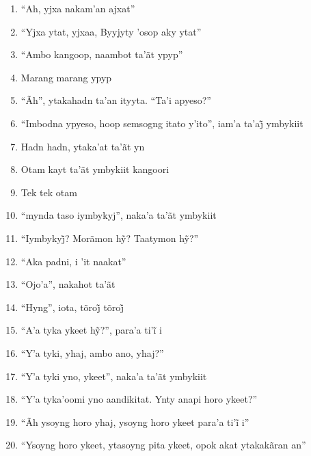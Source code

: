 \begin{enumerate}
 \item ``Ah, yjxa nakam'an ajxat''

 \item ``Yjxa ytat, yjxaa, Byyjyty 'osop aky ytat''

 \item ``Ambo kangoop, naambot ta'ãt ypyp''

 \item Marang marang ypyp

 \item ``Ãh'', ytakahadn ta'an ityyta. ``Ta'i apyeso?''

 \item ``Imbodna ypyeso, hoop semsogng itato y’ito'', iam’a ta’aj̃ ymbykiit

 \begin{center}\end{center}

 \item Hadn hadn, ytaka'at ta'ãt yn

 \item Otam kayt ta'ãt ymbykiit kangoori

 \item Tek tek otam

 \item ``mynda taso iymbykyj'', naka'a ta'ãt ymbykiit

 \item ``Iymbykyj̃? Morãmon hỹ? Taatymon hỹ?''

 \item ``Aka padni, i 'it naakat''

 \item ``Ojo'a'', nakahot ta'ãt

 \item ``Hyng'', iota, tõroj̃ tõroj̃

 \item ``A’a tyka ykeet hỹ?'', para’a ti’ĩ i

 \item ``Y'a tyki, yhaj, ambo ano, yhaj?''

 \item ``Y'a tyki yno, ykeet'', naka'a ta'ãt ymbykiit

 \item ``Y'a tyka'oomi yno aandikitat. Ynty anapi horo ykeet?''

 \item ``Ãh ysoyng horo yhaj, ysoyng horo ykeet para’a ti’ĩ i''

 \item ``Ysoyng horo ykeet, ytasoyng pita ykeet, opok akat ytakakãran an''


\end{enumerate}
